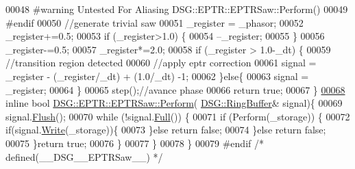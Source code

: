 \begin{DoxyCode}
00048 \textcolor{preprocessor}{#warning Untested For Aliasing DSG::EPTR::EPTRSaw::Perform()}
00049 \textcolor{preprocessor}{#endif}
00050             \textcolor{comment}{//generate trivial saw}
00051             \_register = \_phasor;
00052             \_register+=0.5;
00053             \textcolor{keywordflow}{if} (\_register>1.0) \{
00054                 --\_register;
00055             \}
00056             \_register-=0.5;
00057             \_register*=2.0;
00058             \textcolor{keywordflow}{if} (\_register > 1.0-\_dt) \{
00059                 \textcolor{comment}{//transition region detected}
00060                 \textcolor{comment}{//apply eptr correction}
00061                 signal = \_register - (\_register/\_dt) + (1.0/\_dt) -1;
00062             \}\textcolor{keywordflow}{else}\{
00063                 signal = \_register;
00064             \}
00065             step();\textcolor{comment}{//avance phase}
00066             \textcolor{keywordflow}{return} \textcolor{keyword}{true};
00067         \}
\hypertarget{_e_p_t_r_saw_8h_source_l00068}{}\hyperlink{class_d_s_g_1_1_e_p_t_r_1_1_e_p_t_r_saw_a9dbefaeeb74e30e722bb5d8ea767cdca}{00068}         \textcolor{keyword}{inline} \textcolor{keywordtype}{bool} \hyperlink{class_d_s_g_1_1_e_p_t_r_1_1_e_p_t_r_saw_aa253efa41cca56f334ccb0fd32c2cd56}{DSG::EPTR::EPTRSaw::Perform}(
      \hyperlink{class_d_s_g_1_1_ring_buffer}{DSG::RingBuffer}& signal)\{
00069             signal.\hyperlink{class_d_s_g_1_1_ring_buffer_ab23c8003d2857809a816068eeb209d60}{Flush}();
00070             \textcolor{keywordflow}{while} (!signal.\hyperlink{class_d_s_g_1_1_ring_buffer_a53ddb04ffcbb5470a8d2b0a3c65b70cb}{Full}()) \{
00071                 \textcolor{keywordflow}{if} (Perform(\_storage)) \{
00072                     \textcolor{keywordflow}{if}(signal.\hyperlink{class_d_s_g_1_1_ring_buffer_aa5dd2caa0a270173251faee40a43d692}{Write}(\_storage))\{
00073                     \}\textcolor{keywordflow}{else} \textcolor{keywordflow}{return} \textcolor{keyword}{false};
00074                 \}\textcolor{keywordflow}{else} \textcolor{keywordflow}{return} \textcolor{keyword}{false};
00075             \}\textcolor{keywordflow}{return} \textcolor{keyword}{true};
00076         \}
00077     \}
00078 \}
00079 \textcolor{preprocessor}{#endif }\textcolor{comment}{/* defined(\_\_DSG\_\_EPTRSaw\_\_) */}\textcolor{preprocessor}{}
\end{DoxyCode}
